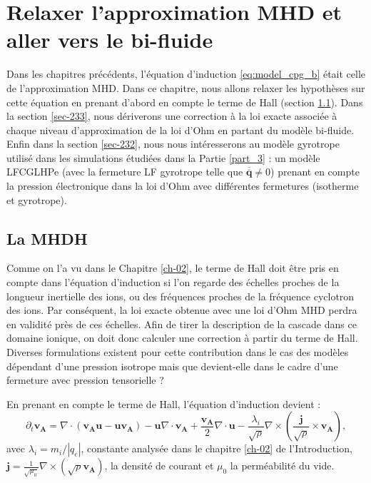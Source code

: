\chapter{Relaxer l'approximation \ac{MHD} et aller vers le bi-fluide}
\renewcommand\partie{\Partie\ Chapitre \thechapter}
\label{ch-23}
\bigskip
\minitoc  

Dans les chapitres précédents, l'équation d'induction \eqref{eq:model_cpg_b} était celle de l'approximation \ac{MHD}. Dans ce chapitre, nous allons relaxer les hypothèses sur cette équation en prenant d'abord en compte le terme de \acs{Hall} (section \ref{sec-231}). Dans la section \ref{sec-233}, nous dériverons une correction à la loi exacte associée à chaque niveau d'approximation de la loi d'Ohm en partant du modèle bi-fluide. Enfin dans la section \ref{sec-232}, nous nous intéresserons au modèle gyrotrope utilisé dans les simulations étudiées dans la Partie \ref{part_3} : un modèle \acs{LFCGLHPe} (avec la fermeture \ac{LF} gyrotrope telle que $\overline{\overline{\boldsymbol{q}}} \neq 0$) prenant en compte la pression électronique dans la loi d'Ohm avec différentes fermetures (isotherme et gyrotrope). 

\section{La \acs{MHDH}}
\label{sec-231}

Comme on l'a vu dans le Chapitre \ref{ch-02}, le terme de \acs{Hall} doit être pris en compte dans l'équation d'induction si l'on regarde des échelles proches de la longueur inertielle des ions, ou des fréquences proches de la fréquence cyclotron des ions. Par conséquent, la loi exacte obtenue avec une loi d'Ohm \ac{MHD} perdra en validité près de ces échelles. Afin de tirer la description de la cascade dans ce domaine ionique, on doit donc calculer une correction à partir du terme de \acs{Hall}. Diverses formulations existent pour cette contribution dans le cas des modèles dépendant d'une pression isotrope mais que devient-elle dans le cadre d'une fermeture avec pression tensorielle ? 

En prenant en compte le terme de \acs{Hall}, l'équation d'induction devient : 
\begin{equation}
\label{eq:model_hall1} \partial_t \boldsymbol{v_A}  =   \nabla \cdot \left(\boldsymbol{v_A}\boldsymbol{u} - \boldsymbol{u}\boldsymbol{v_A}\right) -  \boldsymbol{u}  \nabla \cdot \boldsymbol{v_A} +  \frac{\boldsymbol{v_A}}{2}  \nabla \cdot \boldsymbol{u} - \frac{\lambda_i}{ \sqrt{\rho} } \nabla \times \left(\frac{\boldsymbol{j}}{\sqrt{\rho}}  \times \boldsymbol{v_A}\right) ,
\end{equation}
avec $\lambda_i = m_i/|q_e|$, constante analysée dans le chapitre \ref{ch-02} de l'Introduction,  $\boldsymbol{j} = \frac{1}{\sqrt{\mu_0}} \nabla \times \left(\sqrt{\rho}\boldsymbol{v_A}\right)$, la densité de courant et $\mu_0$ la perméabilité du vide. 

